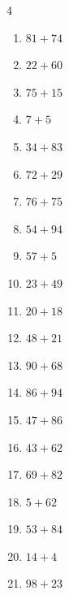 \begin{multicols}{4}
\begin{enumerate}
\columnbreak %

\resetques

  \item $81+74$
        \phantom{$=155$}

  \item $22+60$
        \phantom{$=82$}

  \item $75+15$
        \phantom{$=90$}

  \item $7+5$
        \phantom{$=12$}

  \item $34+83$
        \phantom{$=117$}

  \item $72+29$
        \phantom{$=101$}

  \item $76+75$
        \phantom{$=151$}

  \item $54+94$
        \phantom{$=148$}

  \item $57+5$
        \phantom{$=62$}

  \item $23+49$
        \phantom{$=72$}

  \item $20+18$
        \phantom{$=38$}

  \item $48+21$
        \phantom{$=69$}

  \item $90+68$
        \phantom{$=158$}

  \item $86+94$
        \phantom{$=180$}

  \item $47+86$
        \phantom{$=133$}

  \item $43+62$
        \phantom{$=105$}

  \item $69+82$
        \phantom{$=151$}

  \item $5+62$
        \phantom{$=67$}

  \item $53+84$
        \phantom{$=137$}

  \item $14+4$
        \phantom{$=18$}

  \item $98+23$
        \phantom{$=121$}


\end{enumerate}
\end{multicols}
